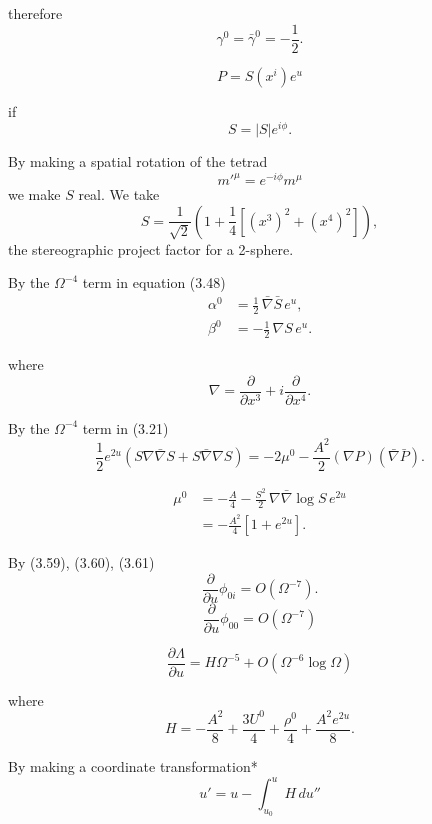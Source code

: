 therefore
\begin{equation}
\gamma^0=\bar{\gamma}^0=-\frac{1}{2}.
\tag{7.4}
\end{equation}

\[
P = S(x^i)e^{u}
\]

if
\[
S = |S|e^{i\phi}.
\]

By making a spatial rotation of the tetrad
\[
m'^{\mu}=e^{-i\phi}m^{\mu}
\]
we make $S$ real. We take
\[
S=\frac{1}{\sqrt{2}}
\left(
1+\frac{1}{4}\left[(x^3)^2+(x^4)^2\right]
\right),
\]
the stereographic project factor for a 2-sphere.

By the $\Omega^{-4}$ term in equation (3.48)
\begin{equation}
\begin{aligned}
\alpha^0
&=
\frac{1}{2}\,\bar{\nabla}\bar{S}\,e^{u},
\\
\beta^0
&=
-\frac{1}{2}\,\nabla S\,e^{u}.
\end{aligned}
\tag{7.5}
\end{equation}

where
\[
\nabla
=
\frac{\partial}{\partial x^3}
+
i\frac{\partial}{\partial x^4}.
\]

By the $\Omega^{-4}$ term in (3.21)
\[
\frac{1}{2}e^{2u}
\left(
S\nabla\bar{\nabla}S
+
S\bar{\nabla}\nabla S
\right)
=
-2\mu^0
-
\frac{A^2}{2}
(\nabla P)(\bar{\nabla}\bar{P}).
\]

\begin{equation}
\begin{aligned}
\mu^0
&=
-\frac{A}{4}
-\frac{S^2}{2}\,
\nabla\bar{\nabla}\log S\,e^{2u}
\\
&=
-\frac{A^2}{4}
\left[
1+e^{2u}
\right].
\end{aligned}
\tag{7.6}
\end{equation}

By (3.59), (3.60), (3.61)
\[
\frac{\partial}{\partial u}\phi_{0i}
=
O(\Omega^{-7}).
\]
\[
\frac{\partial}{\partial u}\phi_{00}
=
O(\Omega^{-7})
\]

\begin{equation}
\frac{\partial\Lambda}{\partial u}
=
H\Omega^{-5}
+
O(\Omega^{-6}\log\Omega)
\tag{7.7}
\end{equation}

where
\[
H
=
-\frac{A^2}{8}
+
\frac{3U^0}{4}
+
\frac{\rho^0}{4}
+
\frac{A^2e^{2u}}{8}.
\]

By making a coordinate transformation*
\begin{equation}
u'
=
u
-
\int_{u_0}^{u} H\,du''
\tag{7.8}
\end{equation}

